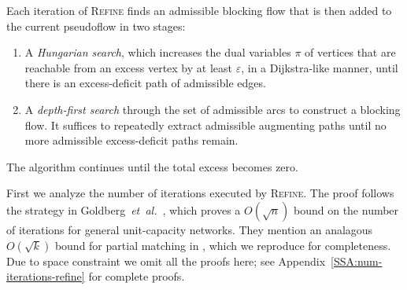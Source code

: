 \documentclass[a4paper,UKenglish]{socg-lipics-v2018}
\makeatletter
\def\note#1{\textcolor{red}{{#1}}}
\def\etal{\emph{et~al.}}
\def\etal{\textit{et~al.}}
\def\eps{\varepsilon}
\theoremstyle{plain}
\numberwithin{figure}{section}
\def\EMPH#1{\textcolor{BrickRed}{{\emph{#1}}}}
\def\n@te#1{\textsf{\boldmath \textbf{$\langle\!\langle$#1$\rangle\!\rangle$}}\leavevmode}
\def\note#1{\textcolor{red}{\n@te{#1}}}
\makeatother
\begin{document}
Each iteration of \textsc{Refine} finds an admissible blocking flow that is then added to the current pseudoflow in two stages:
\begin{enumerate}
\item
A \EMPH{Hungarian search}, which increases the dual variables $\pi$ of vertices that are reachable from an excess vertex by at least $\eps$, in a Dijkstra-like manner, until there is an excess-deficit path of admissible edges.
\item
A \EMPH{depth-first search} through the set of admissible arcs to construct a blocking flow.
It suffices to repeatedly extract admissible augmenting paths until no more admissible excess-deficit paths remain.
\end{enumerate}
The algorithm continues until the total excess becomes zero.

First we analyze the number of iterations executed by \textsc{Refine}.
The proof follows the strategy in Goldberg~\etal~\cite[Section~3.2]{GHKT17},
which proves a $O(\sqrt{n})$ bound on the number of iterations for general
unit-capacity networks.
They mention an analagous $O(\sqrt{k})$ bound for partial matching in
\cite[Section~6.1]{GHKT17}, which we reproduce for completeness.
Due to space constraint we omit all the proofs here;
see Appendix~\ref{SSA:num-iterations-refine} for complete proofs.
\end{document}
